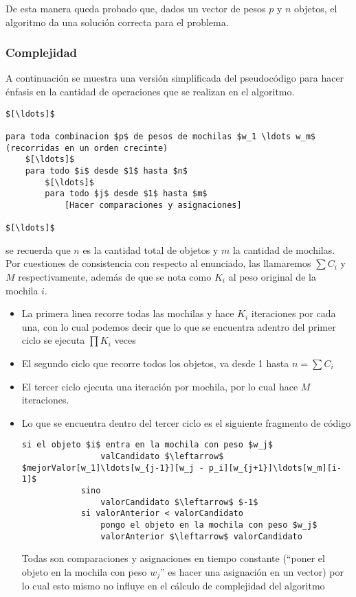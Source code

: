 De esta manera queda probado que, dados un vector de pesos $p$ y $n$ objetos, el algoritmo da una solución correcta para el problema. \QEDB

\subsubsection{Complejidad}

A continuación se muestra una versión simplificada del pseudocódigo para hacer énfasis en la cantidad de operaciones que se realizan en el algoritmo.

\lstset{basicstyle=\large}
\begin{lstlisting}
$[\ldots]$

para toda combinacion $p$ de pesos de mochilas $w_1 \ldots w_m$ (recorridas en un orden crecinte)
	$[\ldots]$
	para todo $i$ desde $1$ hasta $n$
		$[\ldots]$
		para todo $j$ desde $1$ hasta $m$
			[Hacer comparaciones y asignaciones]

$[\ldots]$

\end{lstlisting}

se recuerda que $n$ es la cantidad total de objetos y $m$ la cantidad de mochilas. Por cuestiones de consistencia con respecto al enunciado, las llamaremos $\sum C_i$ y $M$ respectivamente, además de que se nota como $K_i$ al peso original de la mochila $i$.

\begin{itemize}
\item La primera linea recorre todas las mochilas y hace $K_i$ iteraciones por cada una, con lo cual podemos decir que lo que se encuentra adentro del primer ciclo se ejecuta $\prod K_i$ veces

\item El segundo ciclo que recorre todos los objetos, va desde 1 hasta $n = \sum C_i$

\item El tercer ciclo ejecuta una iteración por mochila, por lo cual hace $M$ iteraciones.

\item Lo que se encuentra dentro del tercer ciclo es el siguiente fragmento de código

\lstset{basicstyle=\large}
\begin{lstlisting}
si el objeto $i$ entra en la mochila con peso $w_j$
				valCandidato $\leftarrow$ $mejorValor[w_1]\ldots[w_{j-1}][w_j - p_i][w_{j+1}]\ldots[w_m][i-1]$
			sino
				valorCandidato $\leftarrow$ $-1$
			si valorAnterior < valorCandidato
				pongo el objeto en la mochila con peso $w_j$
				valorAnterior $\leftarrow$ valorCandidato
\end{lstlisting}

Todas son comparaciones y asignaciones en tiempo constante (``poner el objeto en la mochila con peso $w_j$'' es hacer una asignación en un vector) por lo cual esto mismo no influye en el cálculo de complejidad del algoritmo
\end{itemize}

